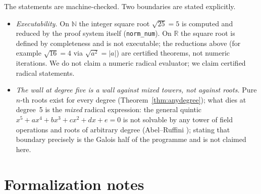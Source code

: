 \documentclass[submission,noinfoline]{jsfds}
\newcommand{\abs}[1]{\lvert #1\rvert}
\begin{document}
The statements are machine-checked. Two boundaries are stated explicitly.

\begin{itemize}
\item \emph{Executability.} On $\mathbb N$ the integer square root
$\sqrt{25}=5$ is computed and reduced by the proof system itself
(\texttt{norm\_num}). On $\mathbb R$ the square root is defined by
completeness and is not executable; the reductions above (for example
$\sqrt{16}=4$ via $\sqrt{a^2}=\abs a$) are certified theorems, not
numeric iterations. We do not claim a numeric radical evaluator; we claim
certified radical statements.
\item \emph{The wall at degree five is a wall against mixed towers, not
against roots.} Pure $n$-th roots exist for every degree
(Theorem~\ref{thm:anydegree}); what dies at degree~5 is the
\emph{mixed} radical expression: the general quintic
$x^5+ax^4+bx^3+cx^2+dx+e=0$ is not solvable by any tower of field
operations and roots of arbitrary degree (Abel--Ruffini \citep{Abel1824});
stating that boundary precisely is the Galois half \citep{Galois1846} of
the programme and is not claimed here.
\end{itemize}

\section{Formalization notes}\label{sec:formal}
\end{document}
